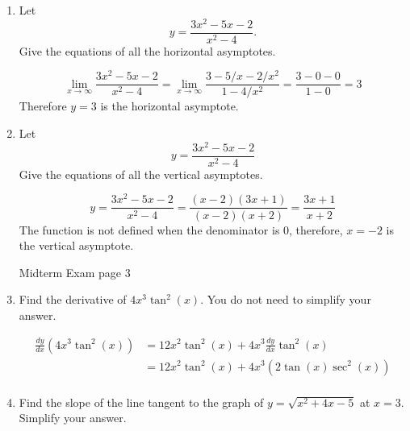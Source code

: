 \documentclass[12pt]{article}
\begin{document}
\begin{enumerate}
\bigskip

\item Let
\[
y = \frac{3x^2 - 5x - 2}{x^2 - 4}.
\]
Give the equations of all the horizontal asymptotes.

\medskip
{}
\[
\lim_{x\rightarrow \infty} \frac{3x^2 - 5x - 2}{x^2 - 4} =
\lim_{x\rightarrow \infty} \frac{3 - 5/x - 2/x^2}{1 - 4/x^2} =
\frac{3-0-0}{1-0}
=3
\]
Therefore $y = 3$ is the horizontal asymptote.

\bigskip

\item Let
\[
y = \frac{3x^2 - 5x - 2}{x^2 - 4}
\]
Give the equations of all the vertical asymptotes.

\medskip
{}
\[
y = \frac{3x^2 - 5x - 2}{x^2 - 4} = \frac{(x-2)(3x+1)}{(x-2)(x+2)}
=\frac{3x+1}{x+2}
\]
The function is not defined when the denominator is 0, therefore, $x = -2$ is
the vertical asymptote. 
\bigskip

\newpage

\noindent Midterm Exam \hfill page 3

\item Find the derivative of $4x^3 \tan^2(x)$. 
You do not need to simplify your answer.

\medskip
{}

\begin{align*}
\frac{dy}{dx}(4x^3\tan^2(x)) &= 12x^2\tan^2(x) + 4x^3
\frac{dy}{dx}\tan^2(x)\\
&= 12x^2\tan^2(x) + 4x^3(2\tan(x)\sec^2(x))\\
\end{align*}

\bigskip

\item Find the slope of the line tangent to the graph of 
$y = \sqrt{x^2 + 4x - 5}$ at $x = 3$. Simplify your answer.


\end{enumerate}
\end{document}
